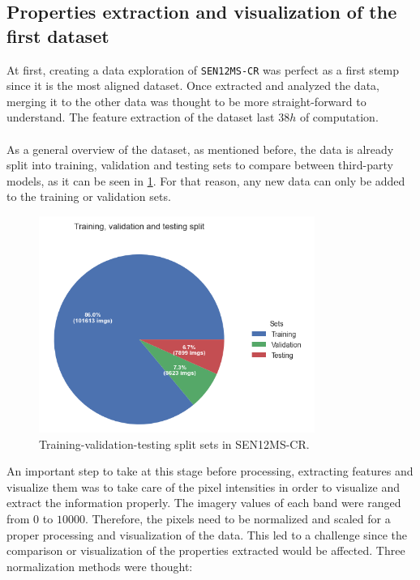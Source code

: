 \subsection{Properties extraction and visualization of the first dataset}
At first, creating a data exploration of \texttt{SEN12MS-CR} \cite{sen12mscr} was perfect as a first stemp since it is the most aligned dataset. Once extracted and analyzed the data, merging it to the other data was thought to be more straight-forward to understand. The feature extraction of the dataset last $38 h$ of computation.
\\
\\
As a general overview of the dataset, as mentioned before, the data is already split into training, validation and testing sets to compare between third-party models, as it can be seen in \ref{fig:eda-training-split}. For that reason, any new data can only be added to the training or validation sets. 
\begin{figure}[H]
	\centering
	\includegraphics[width=9cm]{imgs/eda/split}
	\caption{Training-validation-testing split sets in SEN12MS-CR.}
	\label{fig:eda-training-split}
\end{figure}
An important step to take at this stage before processing, extracting features and visualize them was to take care of the pixel intensities in order to visualize and extract the information properly. The imagery values of each band were ranged from $0$ to $10000$. Therefore, the pixels need to be normalized and scaled for a proper processing and visualization of the data. This led to a challenge since the comparison or visualization of the properties extracted would be affected. Three normalization methods were thought:
